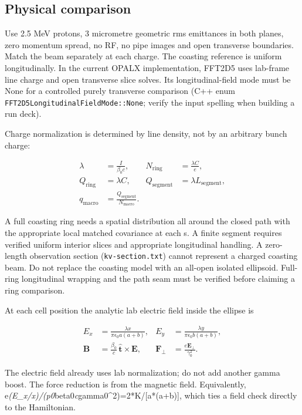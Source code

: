 \documentclass[
  11pt,
  a4paper,
]{article}
\begin{document}
\subsection{Physical comparison}\label{physical-comparison}

Use 2.5 MeV protons, 3 micrometre geometric rms emittances in both
planes, zero momentum spread, no RF, no pipe images and open transverse
boundaries. Match the beam separately at each charge. The coasting
reference is uniform longitudinally. In the current OPALX
implementation, FFT2D5 uses lab-frame line charge and open transverse
slice solves. Its longitudinal-field mode must be None for a controlled
purely transverse comparison (C++ enum
\texttt{FFT2D5LongitudinalFieldMode::None}; verify the input spelling
when building a run deck).

Charge normalization is determined by line density, not by an arbitrary
bunch charge:

\[
\begin{aligned}
\lambda&=\frac{I}{\beta_0c},&N_{\mathrm{ring}}&=\frac{\lambda C}{e},\\
Q_{\mathrm{ring}}&=\lambda C,&Q_{\mathrm{segment}}&=\lambda L_{\mathrm{segment}},\\
q_{\mathrm{macro}}&=\frac{Q_{\mathrm{segment}}}{N_{\mathrm{macro}}}.
\end{aligned}
\]

A full coasting ring needs a spatial distribution all around the closed
path with the appropriate local matched covariance at each s. A finite
segment requires verified uniform interior slices and appropriate
longitudinal handling. A zero-length observation section
(\texttt{kv-section.txt}) cannot represent a charged coasting beam. Do
not replace the coasting model with an all-open isolated ellipsoid.
Full-ring longitudinal wrapping and the path seam must be verified
before claiming a ring comparison.

At each cell position the analytic lab electric field inside the ellipse
is

\[
\begin{aligned}
E_x&=\frac{\lambda x}{\pi\epsilon_0a(a+b)},&
E_y&=\frac{\lambda y}{\pi\epsilon_0b(a+b)},\\
\mathbf B&=\frac{\beta_0}{c}\,\hat{\mathbf t}\times\mathbf E,&
\mathbf F_\perp&=\frac{e\mathbf E_\perp}{\gamma_0^2}.
\end{aligned}
\]

The electric field already uses lab normalization; do not add another
gamma boost. The force reduction is from the magnetic field.
Equivalently,
e\emph{(E\_x/x)/(p0}beta0\emph{c}gamma0\^{}2)=2*K/{[}a*(a+b){]}, which
ties a field check directly to the Hamiltonian.
\end{document}

